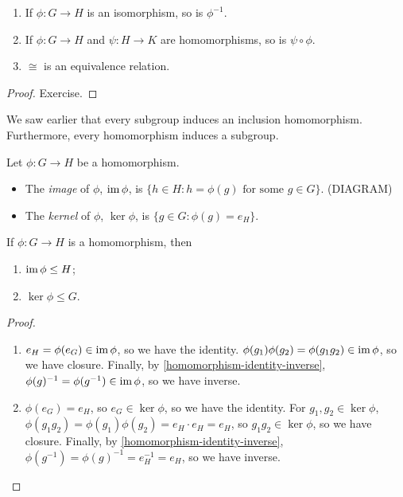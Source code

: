 \documentclass{../../template/note}
\begin{document}
    \begin{lemma}
        \begin{enumerate}
            \item If \(\phi: G \to H\) is an isomorphism, so is \(\phi^{-1}\).
            \item If \(\phi: G \to H\) and \(\psi: H \to K\) are homomorphisms, so is \(\psi \circ \phi\).
            \item \(\cong\) is an equivalence relation.
        \end{enumerate}
    \end{lemma}
    
    \begin{proof}
        Exercise.
    \end{proof}
    
    We saw earlier that every subgroup induces an inclusion homomorphism. Furthermore, every homomorphism induces a subgroup.

    \begin{definition}
        Let \(\phi: G \to H\) be a homomorphism.
        \begin{itemize}
            \item The \emph{image} of \(\phi\), \(\operatorname{im} \phi \), is \(\{h \in H: h = \phi(g) \text{ for some } g \in G\}\). (DIAGRAM)
            \item The \emph{kernel} of \(\phi\), \(\ker \phi\), is \(\{g \in G: \phi(g) = e_H\}\).
        \end{itemize}        
    \end{definition}
    
    \begin{proposition}
        If \(\phi: G \to H\) is a homomorphism, then
        \begin{enumerate}
            \item \(\operatorname{im} \phi \leq H\);
            \item \(\ker \phi \leq G\).
        \end{enumerate}
    \end{proposition}
    
    \begin{proof}
        \begin{enumerate}
            \item \(e_H = \phi(e_G) \in \operatorname{im} \phi\), so we have the identity. \(\phi(g_1)\phi(g_2) = \phi(g_1g_2) \in \operatorname{im} \phi\), so we have closure. Finally, by \cref{homomorphism-identity-inverse}, \(\phi(g)^{-1} = \phi(g^{-1}) \in \operatorname{im} \phi\), so we have inverse.
            \item \(\phi(e_G) = e_H\), so \(e_G \in \ker \phi\), so we have the identity. For \(g_1, g_2 \in \ker \phi\), \(\phi(g_1g_2) = \phi(g_1)\phi(g_2) = e_H \cdot e_H = e_H\), so \(g_1g_2 \in \ker \phi\), so we have closure. Finally, by \cref{homomorphism-identity-inverse}, \(\phi(g^{-1}) = \phi(g)^{-1} = e_H^{-1} = e_H\), so we have inverse.
        \end{enumerate}
    \end{proof}
    
\end{document}
